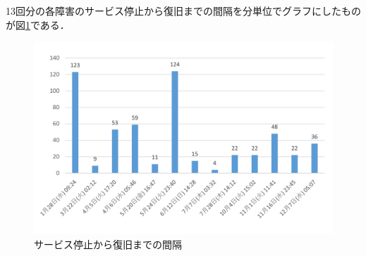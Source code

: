 13回分の各障害のサービス停止から復旧までの間隔を分単位でグラフにしたものが図\ref{時間}である．
\begin{figure}[htb]
\centering
\includegraphics[width=13cm]{img/graph1.pdf}
\caption{サービス停止から復旧までの間隔}\label{時間}
\end{figure}




